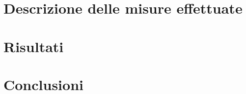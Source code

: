 \documentclass{article}
\begin{document}
\section{Descrizione delle misure effettuate}
\newpage

\section{Risultati}
\newpage

\section{Conclusioni}
\newpage
\end{document}
